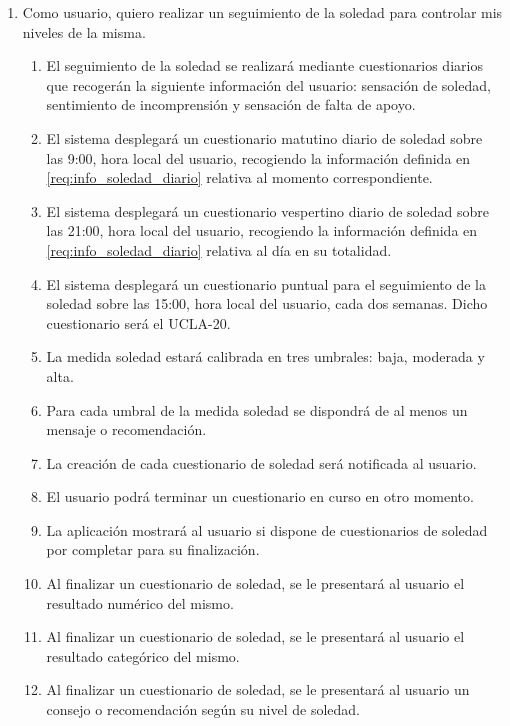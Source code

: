         \begin{enumerate}[resume=req-usuario,label=\textbf{\texttt{RU-\arabic*}}]
            \item Como usuario, quiero realizar un seguimiento de la soledad para controlar mis niveles de la misma.
            \begin{enumerate}[resume=req-funcionales,label=\textbf{\texttt{RF-\arabic*}}]
                \item \label{req:info_soledad_diario} El seguimiento de la soledad se realizará mediante cuestionarios diarios que recogerán la siguiente información del usuario: sensación de soledad, sentimiento de incomprensión y sensación de falta de apoyo.
                \item El sistema desplegará un cuestionario matutino diario de soledad sobre las 9:00, hora local del usuario, recogiendo la información definida en \ref{req:info_soledad_diario} relativa al momento correspondiente.
                \item  El sistema desplegará un cuestionario vespertino diario de soledad sobre las 21:00, hora local del usuario, recogiendo la información definida en \ref{req:info_soledad_diario} relativa al día en su totalidad.
                \item El sistema desplegará un cuestionario puntual para el seguimiento de la soledad sobre las 15:00, hora local del usuario, cada dos semanas. Dicho cuestionario será el UCLA-20.
                \item La medida soledad estará calibrada en tres umbrales: baja, moderada y alta.
                \item Para cada umbral de la medida soledad se dispondrá de al menos un mensaje o recomendación.
                \item La creación de cada cuestionario de soledad será notificada al usuario.
                \item El usuario podrá terminar un cuestionario en curso en otro momento.
                \item La aplicación mostrará al usuario si dispone de cuestionarios de soledad por completar para su finalización.
                \item Al finalizar un cuestionario de soledad, se le presentará al usuario el resultado numérico del mismo.
                \item Al finalizar un cuestionario de soledad, se le presentará al usuario el resultado categórico del mismo.
                \item Al finalizar un cuestionario de soledad, se le presentará al usuario un consejo o recomendación según su nivel de soledad.
            \end{enumerate}
        \end{enumerate}
